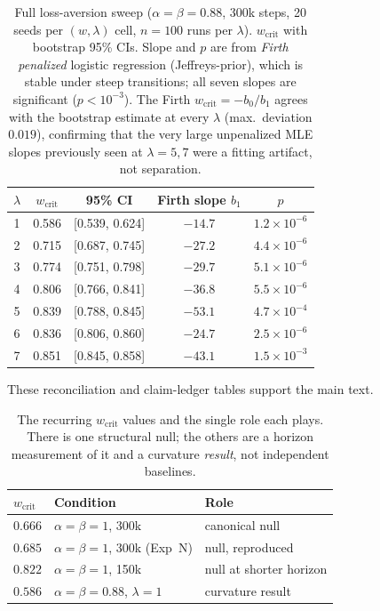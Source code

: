 \documentclass[letterpaper]{article}
\theoremstyle{plain}
\newcommand{\wcrit}{w_{\mathrm{crit}}}
\begin{document}
\begin{table}[tbp]
\centering
\caption{Full loss-aversion sweep ($\alpha{=}\beta{=}0.88$, 300k steps,
20 seeds per $(w,\lambda)$ cell, $n{=}100$ runs per $\lambda$).
$\wcrit$ with bootstrap 95\% CIs. Slope and $p$ are from
\emph{Firth penalized} logistic regression (Jeffreys-prior), which is stable
under steep transitions; all seven slopes are significant ($p<10^{-3}$). The
Firth $\wcrit=-b_0/b_1$ agrees with the bootstrap estimate at every $\lambda$
(max.\ deviation $0.019$), confirming that the very large unpenalized MLE slopes
previously seen at $\lambda{=}5,7$ were a fitting artifact, not separation.}
\label{tab:lambda_sweep}
\small
\begin{tabular}{ccccc}
\toprule
$\lambda$ & $\wcrit$ & 95\% CI & Firth slope $b_1$ & $p$ \\
\midrule
1 & 0.586 & [0.539, 0.624] & $-14.7$ & $1.2\times10^{-6}$ \\
2 & 0.715 & [0.687, 0.745] & $-27.2$ & $4.4\times10^{-6}$ \\
3 & 0.774 & [0.751, 0.798] & $-29.7$ & $5.1\times10^{-6}$ \\
4 & 0.806 & [0.766, 0.841] & $-36.8$ & $5.5\times10^{-6}$ \\
5 & 0.839 & [0.788, 0.845] & $-53.1$ & $4.7\times10^{-4}$ \\
6 & 0.836 & [0.806, 0.860] & $-24.7$ & $2.5\times10^{-6}$ \\
7 & 0.851 & [0.845, 0.858] & $-43.1$ & $1.5\times10^{-3}$ \\
\bottomrule
\end{tabular}
\end{table}

\label{sec:appendix_tables}
These reconciliation and claim-ledger tables support the main text.

\begin{table}[tbp]
\centering
\caption{The recurring $\wcrit$ values and the single role each plays. There is
one structural null; the others are a horizon measurement of it and a curvature
\emph{result}, not independent baselines.}
\label{tab:baselines}
\small
\begin{tabular}{lll}
\toprule
$\wcrit$ & Condition & Role \\
\midrule
$0.666$ & $\alpha{=}\beta{=}1$, 300k & canonical null \\
$0.685$ & $\alpha{=}\beta{=}1$, 300k (Exp~N) & null, reproduced \\
$0.822$ & $\alpha{=}\beta{=}1$, 150k & null at shorter horizon \\
$0.586$ & $\alpha{=}\beta{=}0.88$, $\lambda{=}1$ & curvature result \\
\bottomrule
\end{tabular}
\end{table}
\end{document}
